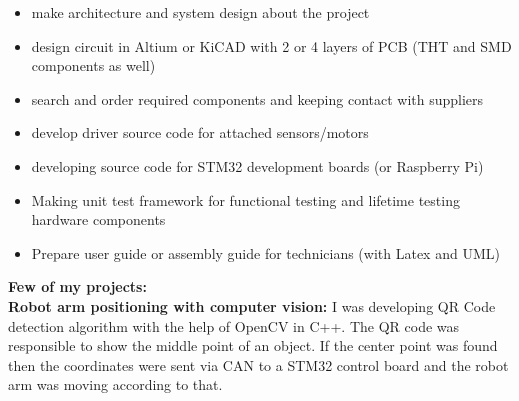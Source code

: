 \documentclass[11pt,oneslide,a4paper,titlepage]{article}
\begin{document}
\begin{tcolorbox}
\begin{minipage}[t]{11cm}
\begin{tcolorbox}[grow to right by=0.75cm,colframe=white,colback=white]
\begin{itemize}
{\begin{itemize}
						\item{make architecture and system design about the project}						
						\item{design circuit in Altium or KiCAD with 2 or 4 layers of PCB (THT and SMD components as well)}
						
						\item{search and order required components and keeping contact with suppliers}			
						\item{develop driver source code for attached sensors/motors}
						
						\item{developing source code for STM32 development boards (or Raspberry Pi)}
						\item{Making unit test framework for functional testing and lifetime testing hardware components}
						\item{Prepare user guide or assembly guide for technicians (with Latex and UML)}
					\end{itemize}
					
					\hfill\break
					\textbf{Few of my projects:} \\
				    \newline \textbf{Robot arm positioning with computer vision:} I was developing QR Code detection algorithm with the help of OpenCV in C++. The QR code was responsible to show the middle point of an object. If the center point was found then the coordinates were sent via CAN to a STM32 control board and the robot arm was moving according to that. \\
				}
			\end{itemize}				
			
		\end{tcolorbox}
	\end{minipage}
\end{tcolorbox}
\end{document}
